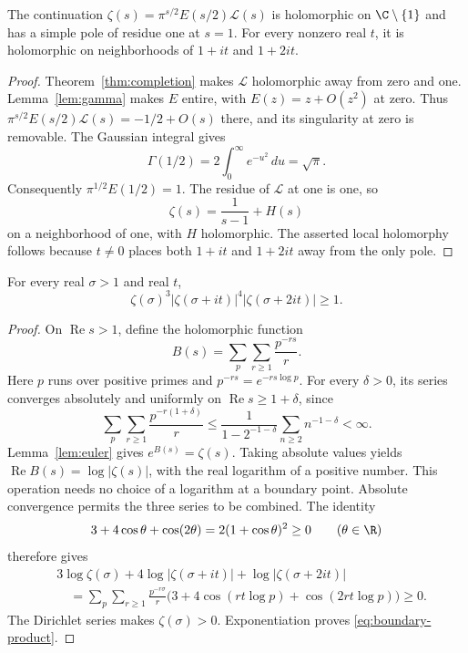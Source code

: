 \begin{lemma}
\label{lem:boundary-germs}
The continuation
$\zeta(s)=\pi^{s/2}E(s/2)\mathcal L(s)$ is holomorphic on
$\C\setminus\{1\}$ and has a simple pole of residue one at $s=1$.
For every nonzero real $t$, it is holomorphic on neighborhoods of
$1+it$ and $1+2it$.
\end{lemma}
\begin{proof}
Theorem~\ref{thm:completion} makes $\mathcal L$ holomorphic away from
zero and one.  Lemma~\ref{lem:gamma} makes $E$ entire, with
$E(z)=z+O(z^2)$ at zero.
Thus $\pi^{s/2}E(s/2)\mathcal L(s)=-1/2+O(s)$ there, and its
singularity at zero is removable.
The Gaussian integral gives
\[
 \Gamma(1/2)=2\int_0^\infty e^{-u^2}\,du=\sqrt\pi.
\]
Consequently $\pi^{1/2}E(1/2)=1$.
The residue of $\mathcal L$ at one is one, so
\begin{equation}
 \zeta(s)=\frac1{s-1}+H(s)
 \label{eq:boundary-pole}
\end{equation}
on a neighborhood of one, with $H$ holomorphic.
The asserted local holomorphy follows because $t\ne0$ places both
$1+it$ and $1+2it$ away from the only pole.
\end{proof}

\begin{lemma}
\label{lem:boundary-prime}
For every real $\sigma>1$ and real $t$,
\begin{equation}
 \zeta(\sigma)^3
 |\zeta(\sigma+it)|^4|\zeta(\sigma+2it)|\geq1.
 \label{eq:boundary-product}
\end{equation}
\end{lemma}
\begin{proof}
On $\operatorname{Re}s>1$, define the holomorphic function
\[
 B(s)=\sum_p\sum_{r\geq1}\frac{p^{-rs}}r.
\]
Here $p$ runs over positive primes and $p^{-rs}=e^{-rs\log p}$.
For every $\delta>0$, its series converges absolutely and uniformly on
$\operatorname{Re}s\geq1+\delta$, since
\[
 \sum_p\sum_{r\geq1}\frac{p^{-r(1+\delta)}}r
 \leq\frac1{1-2^{-1-\delta}}\sum_{n\geq2}n^{-1-\delta}<\infty.
\]
Lemma~\ref{lem:euler} gives $e^{B(s)}=\zeta(s)$.
Taking absolute values yields $\operatorname{Re}B(s)=\log|\zeta(s)|$,
with the real logarithm of a positive number.
This operation needs no choice of a logarithm at a boundary point.
Absolute convergence permits the three series to be combined.
The identity
\[
 3+4\cos\theta+\cos(2\theta)=2(1+\cos\theta)^2\geq0
 \qquad(\theta\in\R)
\]
therefore gives
\begin{align*}
 &3\log\zeta(\sigma)+4\log|\zeta(\sigma+it)|
                      +\log|\zeta(\sigma+2it)|\\
 &\quad=\sum_p\sum_{r\geq1}\frac{p^{-r\sigma}}r
       \bigl(3+4\cos(rt\log p)+\cos(2rt\log p)\bigr)\geq0.
\end{align*}
The Dirichlet series makes $\zeta(\sigma)>0$.
Exponentiation proves \eqref{eq:boundary-product}.
\end{proof}

